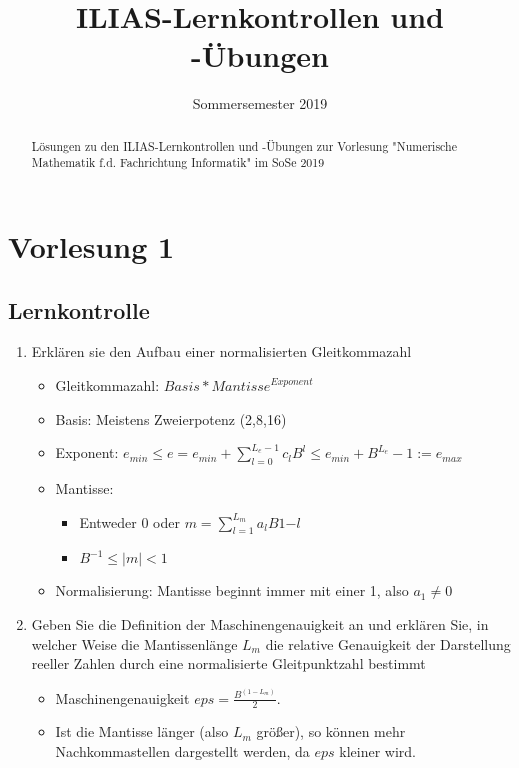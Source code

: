 \documentclass[]{article}
\title{ILIAS-Lernkontrollen und -Übungen}
\date{Sommersemester 2019}
\begin{document}
\maketitle

\begin{abstract}
Lösungen zu den ILIAS-Lernkontrollen und -Übungen zur Vorlesung "Numerische Mathematik f.d. Fachrichtung Informatik" im SoSe 2019
\end{abstract}

\section{Vorlesung 1}
\subsection{Lernkontrolle}
\begin{enumerate}
	\item Erklären sie den Aufbau einer normalisierten Gleitkommazahl
		\begin{itemize}
			\item Gleitkommazahl: $\textit{Basis} * \textit{Mantisse}^{\textit{Exponent}}$
			\item Basis: Meistens Zweierpotenz (2,8,16)
			\item Exponent: $e_{min} \leq e = e_{min} + \sum_{l=0}^{L_e - 1}c_l B^l \leq e_{min} + B^{L_e} - 1 := e_{max}$
			\item Mantisse: \begin{itemize}
				\item Entweder 0 oder $m = \sum_{l=1}^{L_m}a_l B1{-l}$
				\item $B^{-1} \leq |m| < 1$
			\end{itemize}
			\item Normalisierung: Mantisse beginnt immer mit einer 1, also $a_1 \neq 0$
		\end{itemize}
	\item Geben Sie die Definition der Maschinengenauigkeit an und erklären Sie, in welcher Weise die Mantissenlänge $L_m$ die relative Genauigkeit der Darstellung reeller Zahlen durch eine normalisierte Gleitpunktzahl bestimmt
		\begin{itemize}
			\item Maschinengenauigkeit $eps = \frac{B^{(1 - L_m)}}{2}$.
			\item Ist die Mantisse länger (also $L_m$ größer), so können mehr Nachkommastellen dargestellt werden, da $eps$ kleiner wird.
		\end{itemize}

\end{enumerate}
\end{document}
